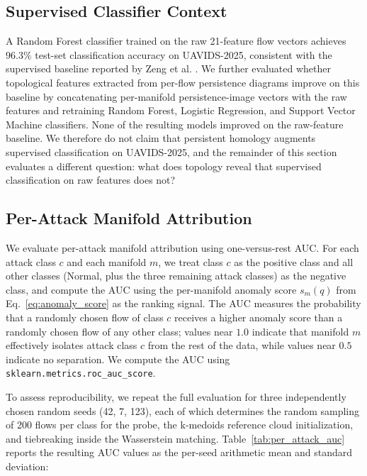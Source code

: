 \documentclass[conf]{new-aiaa}
\begin{document}
\subsection{Supervised Classifier Context}

A Random Forest classifier trained on the raw 21-feature flow vectors achieves $96.3\%$ test-set classification accuracy on UAVIDS-2025, consistent with the supervised baseline reported by Zeng et al. \cite{Zeng}. We further evaluated whether topological features extracted from per-flow persistence diagrams improve on this baseline by concatenating per-manifold persistence-image vectors with the raw features and retraining Random Forest, Logistic Regression, and Support Vector Machine classifiers. None of the resulting models improved on the raw-feature baseline. We therefore do not claim that persistent homology augments supervised classification on UAVIDS-2025, and the remainder of this section evaluates a different question: what does topology reveal that supervised classification on raw features does not?

\subsection{Per-Attack Manifold Attribution}

We evaluate per-attack manifold attribution using one-versus-rest AUC. For each attack class $c$ and each manifold $m$, we treat class $c$ as the positive class and all other classes (Normal, plus the three remaining attack classes) as the negative class, and compute the AUC using the per-manifold anomaly score $s_m(q)$ from Eq.~\eqref{eq:anomaly_score} as the ranking signal. The AUC measures the probability that a randomly chosen flow of class $c$ receives a higher anomaly score than a randomly chosen flow of any other class; values near $1.0$ indicate that manifold $m$ effectively isolates attack class $c$ from the rest of the data, while values near $0.5$ indicate no separation. We compute the AUC using \texttt{sklearn.metrics.roc\_auc\_score}.

To assess reproducibility, we repeat the full evaluation for three independently chosen random seeds (42, 7, 123), each of which determines the random sampling of 200 flows per class for the probe, the k-medoids reference cloud initialization, and tiebreaking inside the Wasserstein matching. Table~\ref{tab:per_attack_auc} reports the resulting AUC values as the per-seed arithmetic mean and standard deviation:
\end{document}

